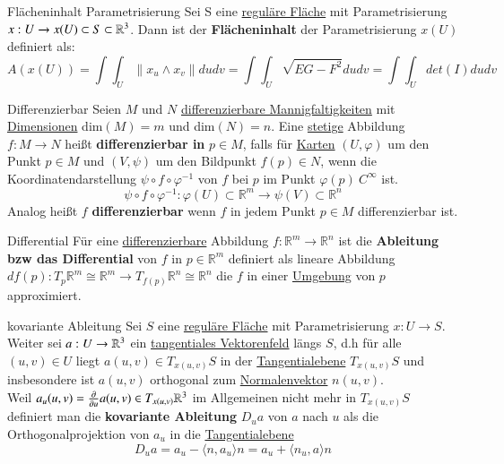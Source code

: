 \begin{titleDef}{Flächeninhalt Parametrisierung}
\label{inhaltPara}
Sei S eine \hyperref[regFlaeche]{reguläre Fläche} mit Parametrisierung $x:U\to x(U)\subset S\subset\mathbb{R}^3$. Dann ist der \textbf{Flächeninhalt} der Parametrisierung $x(U)$ definiert als:
$$A(x(U))=\int\int_{U}\lVert x_u\wedge x_v\rVert dudv=
\int\int_{U}\sqrt{EG-F^2} dudv=\int\int_{U}det(I) dudv$$
\end{titleDef}

\begin{titleDef}{Differenzierbar}
\label{differenzierbar}
Seien $M$ und $N$ \hyperref[diffMannigfaltigkeit]{differenzierbare Mannigfaltigkeiten} mit \hyperref[dimMannigfaltigkeit]{Dimensionen} dim$(M) = m$ und dim$(N)=n$. Eine \hyperref[stetig]{stetige} Abbildung $f:M\to N$ heißt \textbf{differenzierbar in }$p\in M$, falls für \hyperref[Karte]{Karten} $(U,\varphi)$ um den Punkt $p\in M$ und $(V,\psi)$ um den Bildpunkt $f(p)\in N$, wenn die Koordinatendarstellung $\psi\circ f\circ\varphi^{-1}$ von $f$ bei $p$ im Punkt $\varphi(p)\: C^\infty$ ist.
$$\psi\circ f\circ\varphi^{-1}:\varphi(U)\subset\mathbb{R}^m\to\psi(V)\subset\mathbb{R}^n$$
Analog heißt $f$ \textbf{differenzierbar} wenn $f$ in jedem Punkt $p\in M$ differenzierbar ist.
\end{titleDef}

\begin{titleDef}{Differential}
\label{differenzial}
Für eine \hyperref[differenzierbar]{differenzierbare} Abbildung $f:\mathbb{R}^m\to\mathbb{R}^n$ ist die \textbf{Ableitung bzw das Differential} von $f$ in $p\in\mathbb{R}^m$ definiert als lineare Abbildung\\ ${df(p):T_p\mathbb{R}^m\cong\mathbb{R}^m\to T_{f(p)}\mathbb{R}^n\cong\mathbb{R}^n}$
die $f$ in einer \hyperref[Umgebung]{Umgebung} von $p$ approximiert.
\end{titleDef}

\begin{titleDef}{kovariante Ableitung}
\label{kovAbleitung}
\label{tangentialesVektorfeld}
Sei $S$ eine \hyperref[regFlaeche]{reguläre Fläche} mit Parametrisierung $x:U\to S$. Weiter sei $a:U\to\mathbb{R}^3$ ein \hyperref[vektorenfeld]{tangentiales Vektorenfeld} längs $S$, d.h für alle $(u,v)\in U$ liegt $a(u,v)\in T_{x(u,v)}S$ in der \hyperref[tangentialebene]{Tangentialebene} $T_{x(u,v)}S$ und insbesondere ist $a(u,v)$ orthogonal zum \hyperref[normalenvektor]{Normalenvektor} $n(u,v)$.\\
Weil $a_u(u,v)=\frac{\partial}{\partial u}a(u,v)\in T_{x(u,v)}\mathbb{R}^3$ im Allgemeinen nicht mehr in $T_{x(u,v)}S$ definiert man die \textbf{kovariante Ableitung} $D_ua$ von $a$ nach $u$ als die Orthogonalprojektion von $a_u$ in die \hyperref[tangentialebene]{Tangentialebene}
$$D_ua=a_u-\langle n,a_u\rangle n=a_u+\langle n_u,a\rangle n$$
\end{titleDef}


